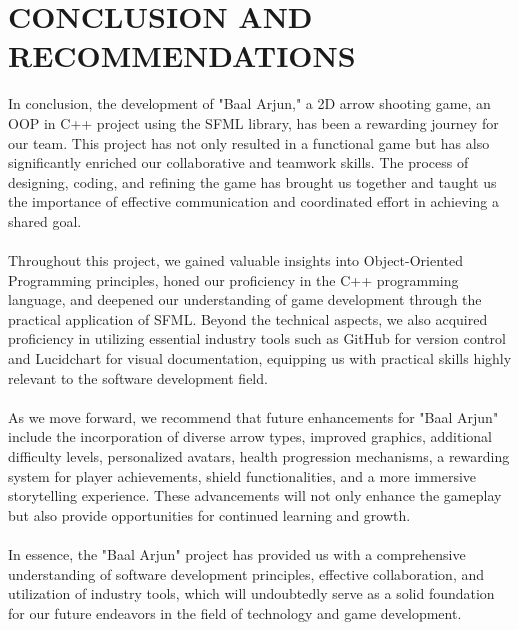 \section{CONCLUSION AND RECOMMENDATIONS}
In conclusion, the development of "Baal Arjun," a 2D arrow shooting game, an OOP in C++ project using the SFML library, has been a rewarding journey for our team. This project has not only resulted in a functional game but has also significantly enriched our collaborative and teamwork skills. The process of designing, coding, and refining the game has brought us together and taught us the importance of effective communication and coordinated effort in achieving a shared goal.\\\\
Throughout this project, we gained valuable insights into Object-Oriented Programming principles, honed our proficiency in the C++ programming language, and deepened our understanding of game development through the practical application of SFML. Beyond the technical aspects, we also acquired proficiency in utilizing essential industry tools such as GitHub for version control and Lucidchart for visual documentation, equipping us with practical skills highly relevant to the software development field.\\\\
As we move forward, we recommend that future enhancements for "Baal Arjun" include the incorporation of diverse arrow types, improved graphics, additional difficulty levels, personalized avatars, health progression mechanisms, a rewarding system for player achievements, shield functionalities, and a more immersive storytelling experience. These advancements will not only enhance the gameplay but also provide opportunities for continued learning and growth.\\\\
In essence, the "Baal Arjun" project has provided us with a comprehensive understanding of software development principles, effective collaboration, and utilization of industry tools, which will undoubtedly serve as a solid foundation for our future endeavors in the field of technology and game development.

\newpage